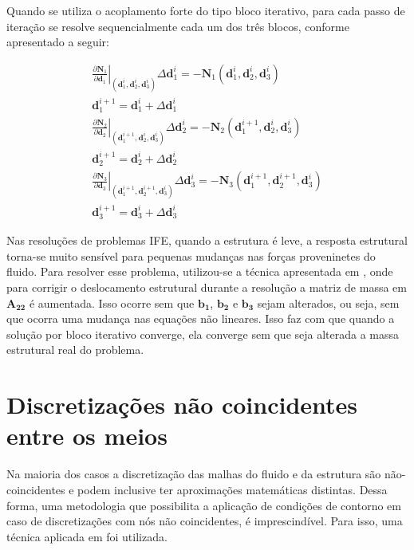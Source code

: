 \documentclass[tese_patricia]{subfiles}
\begin{document}
Quando se utiliza o acoplamento forte do tipo bloco iterativo, para cada passo de iteração se resolve sequencialmente cada um dos três blocos, conforme apresentado a seguir:


\begin{align}
	\left .\frac{\partial\mathbf{N}_{1}}{\partial\mathbf{d}_{1}}\right|_{\left(\mathbf{d}_{1}^{i},\mathbf{d}_{2}^{i},\mathbf{d}_{3}^{i}\right)} \Delta\mathbf{d}_{1}^{i} = - \mathbf{N}_{1}\left(\mathbf{d}_{1}^{i},\mathbf{d}_{2}^{i},\mathbf{d}_{3}^{i}\right)\\
	\mathbf{d}_{1}^{i+1} =  \mathbf{d}_{1}^{i} + \Delta\mathbf{d}_{1}^{i}	\\
	\left.\frac{\partial\mathbf{N}_{2}}{\partial\mathbf{d}_{2}}\right|_{\left(\mathbf{d}_{1}^{i+1},\mathbf{d}_{2}^{i},\mathbf{d}_{3}^{i}\right)} \Delta\mathbf{d}_{2}^{i} = - \mathbf{N}_{2}\left(\mathbf{d}_{1}^{i+1},\mathbf{d}_{2}^{i},\mathbf{d}_{3}^{i}\right)\\
	\mathbf{d}_{2}^{i+1} =  \mathbf{d}_{2}^{i} + \Delta\mathbf{d}_{2}^{i} \\
	\left.\frac{\partial\mathbf{N}_{3}}{\partial\mathbf{d}_{3}}\right|_{\left(\mathbf{d}_{1}^{i+1},\mathbf{d}_{2}^{i+1},\mathbf{d}_{3}^{i}\right)} \Delta\mathbf{d}_{3}^{i} = - \mathbf{N}_{3}\left(\mathbf{d}_{1}^{i+1},\mathbf{d}_{2}^{i+1},\mathbf{d}_{3}^{i}\right)\\
	\mathbf{d}_{3}^{i+1} =  \mathbf{d}_{3}^{i} + \Delta\mathbf{d}_{3}^{i} 
\end{align}


Nas resoluções de problemas IFE, quando a estrutura é leve, a resposta estrutural torna-se muito sensível para pequenas mudanças nas forças proveninetes do fluido. Para resolver esse problema, utilizou-se a técnica apresentada em , onde para corrigir o deslocamento estrutural durante a resolução a matriz de massa em $\mathbf{A_{22}}$ é aumentada. Isso ocorre sem que $\mathbf{b_{1}}$, $\mathbf{b_{2}}$ e $\mathbf{b_{3}}$ sejam alterados, ou seja, sem que ocorra uma mudança nas equações não lineares. Isso faz com que quando a solução por bloco iterativo converge, ela converge sem que seja alterada a massa estrutural real do problema.

\section{Discretizações não coincidentes entre os meios}

Na maioria dos casos a discretização das malhas do fluido e da estrutura são não-coincidentes e podem inclusive ter aproximações matemáticas distintas. Dessa forma, uma metodologia que possibilita a aplicação de condições de contorno em caso de discretizações com nós não coincidentes, é imprescindível. Para isso, uma técnica aplicada em  foi utilizada.
\end{document}
